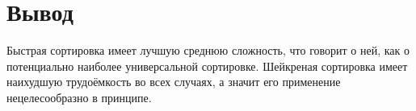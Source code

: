 \section{Вывод}
Быстрая сортировка имеет лучшую среднюю сложность, что говорит о ней, как о потенциально наиболее универсальной сортировке. Шейкреная сортировка имеет наихудшую трудоёмкость во всех случаях, а значит его применение нецелесообразно в принципе.

